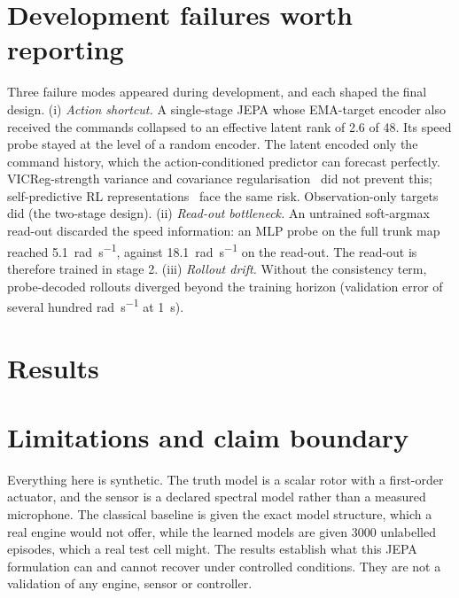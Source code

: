\documentclass[10pt,journal]{IEEEtran}
\begin{document}
\section{Development failures worth reporting}
Three failure modes appeared during development, and each shaped the final design.
(i) \emph{Action shortcut.} A single-stage JEPA whose EMA-target encoder also received the commands collapsed to an effective latent rank of 2.6 of 48. Its speed probe stayed at the level of a random encoder. The latent encoded only the command history, which the action-conditioned predictor can forecast perfectly. VICReg-strength variance and covariance regularisation~\cite{bardes2022vicreg} did not prevent this; self-predictive RL representations~\cite{schwarzer2021spr} face the same risk. Observation-only targets did (the two-stage design).
(ii) \emph{Read-out bottleneck.} An untrained soft-argmax read-out discarded the speed information: an MLP probe on the full trunk map reached \SI{5.1}{\radian\per\second}, against \SI{18.1}{\radian\per\second} on the read-out. The read-out is therefore trained in stage 2.
(iii) \emph{Rollout drift.} Without the consistency term, probe-decoded rollouts diverged beyond the training horizon (validation error of several hundred \si{\radian\per\second} at \SI{1}{\second}).

\section{Results}


\section{Limitations and claim boundary}
Everything here is synthetic. The truth model is a scalar rotor with a first-order actuator, and the sensor is a declared spectral model rather than a measured microphone. The classical baseline is given the exact model structure, which a real engine would not offer, while the learned models are given 3000 unlabelled episodes, which a real test cell might. The results establish what this JEPA formulation can and cannot recover under controlled conditions. They are not a validation of any engine, sensor or controller.



\end{document}

